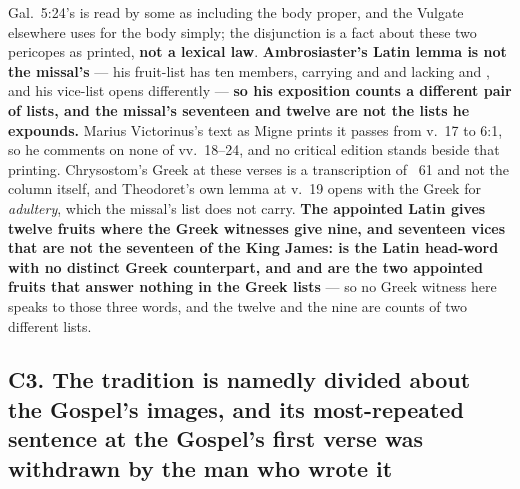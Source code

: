 Gal.\ 5:24's  is read by some
as including the body proper, and the Vulgate elsewhere uses  for
the body simply; the disjunction is a fact about these two pericopes as
printed, \textbf{not a lexical law}. \textbf{Ambrosiaster's Latin lemma is not
the missal's} --- his fruit-list has ten members, carrying  and
 and lacking  and , and his
vice-list opens differently --- \textbf{so his exposition counts a different
pair of lists, and the missal's seventeen and twelve are not the lists he
expounds.} Marius Victorinus's text as Migne prints
it passes from v.~17 to 6:1, so he comments on none of vv.~18--24, and no critical
edition stands beside that printing. Chrysostom's Greek at these verses is a
transcription of ~61 and not the column itself, and Theodoret's
own lemma at v.~19 opens with the Greek for \emph{adultery}, which the missal's
list does not carry. \textbf{The appointed Latin gives twelve fruits where the
Greek witnesses give nine, and seventeen vices that are not the seventeen of the
King James:  is the Latin head-word with no distinct Greek
counterpart, and  and  are the two appointed
fruits that answer nothing in the Greek lists} --- so no Greek witness here
speaks to those three words, and the twelve and the nine are counts of two
different lists.

\subsection*{C3. The tradition is namedly divided about the Gospel's images, and its most-repeated sentence at the Gospel's first verse was withdrawn by the man who wrote it}

